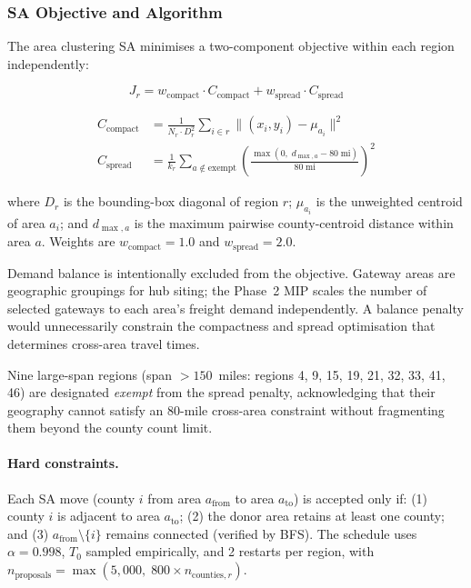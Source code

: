 \subsubsection{SA Objective and Algorithm}

The area clustering SA minimises a two-component objective within each region
independently:

\begin{equation}
  J_r = w_{\text{compact}} \cdot C_{\text{compact}} + w_{\text{spread}} \cdot C_{\text{spread}}
  \label{eq:task6-obj}
\end{equation}

\begin{align}
  C_{\text{compact}} &= \frac{1}{N_r \cdot D_r^2}
    \sum_{i \in r} \bigl\|(x_i, y_i) - \mu_{a_i}\bigr\|^2
  \label{eq:task6-compact} \\[6pt]
  C_{\text{spread}} &= \frac{1}{k_r} \sum_{a \notin \text{exempt}}
    \left(\frac{\max(0,\; d_{\max,a} - 80\;\text{mi})}{80\;\text{mi}}\right)^2
  \label{eq:task6-spread}
\end{align}

where $D_r$ is the bounding-box diagonal of region $r$; $\mu_{a_i}$ is the unweighted
centroid of area $a_i$; and $d_{\max,a}$ is the maximum pairwise county-centroid distance
within area $a$. Weights are $w_{\text{compact}} = 1.0$ and $w_{\text{spread}} = 2.0$.

Demand balance is intentionally excluded from the objective. Gateway areas are
geographic groupings for hub siting; the Phase~2 MIP scales the number of selected
gateways to each area's freight demand independently. A balance penalty would
unnecessarily constrain the compactness and spread optimisation that determines
cross-area travel times.

Nine large-span regions (span $> 150$~miles: regions 4, 9, 15, 19, 21, 32, 33, 41, 46)
are designated \emph{exempt} from the spread penalty, acknowledging that their geography
cannot satisfy an 80-mile cross-area constraint without fragmenting them beyond the county
count limit.

\paragraph{Hard constraints.}
Each SA move (county $i$ from area $a_{\text{from}}$ to area $a_{\text{to}}$) is accepted
only if: (1) county $i$ is adjacent to area $a_{\text{to}}$; (2) the donor area retains
at least one county; and (3) $a_{\text{from}} \setminus \{i\}$ remains connected
(verified by BFS). The schedule uses $\alpha = 0.998$, $T_0$ sampled empirically, and
2 restarts per region, with $n_{\text{proposals}} = \max(5{,}000,\; 800 \times n_{\text{counties},r})$.

